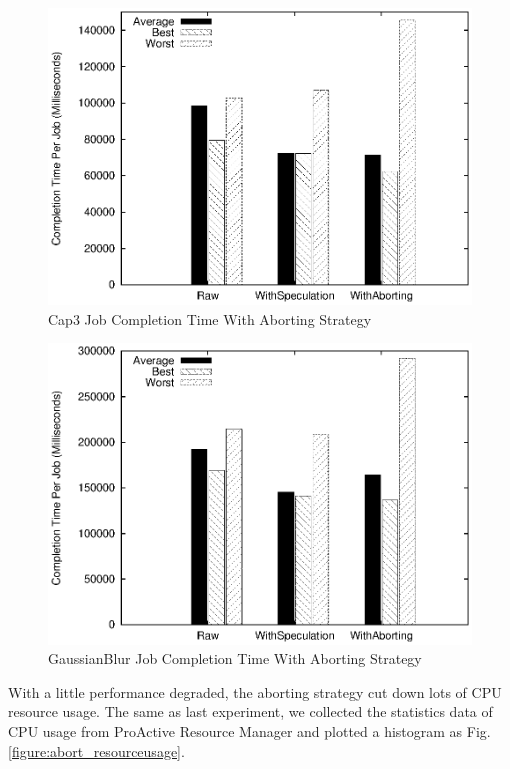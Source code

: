 \begin{figure}
\centering
\includegraphics[width=0.9\columnwidth]{figures/abort_completiontime_cap3.eps}
\caption{Cap3 Job Completion Time With Aborting Strategy}
\label{figure:abort_completiontime_cap3}
\end{figure}

\begin{figure}
\centering
\includegraphics[width=0.9\columnwidth]{figures/abort_completiontime_gaussianblur.eps}
\caption{GaussianBlur Job Completion Time With Aborting Strategy}
\label{figure:abort_completiontime_gaussianblur}
\end{figure}

With a little performance degraded, the aborting strategy cut down lots of CPU resource usage. The same as last experiment, we collected the statistics data of CPU usage from ProActive Resource Manager and plotted a histogram as Fig. \ref{figure:abort_resourceusage}.

